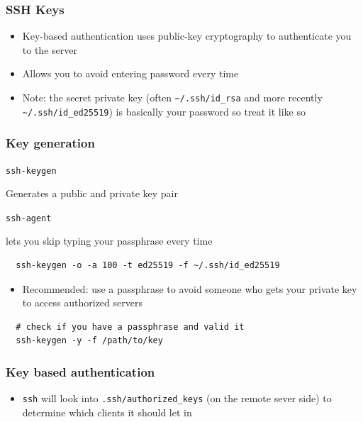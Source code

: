 \documentclass[letterpaper,12pt]{article}
\newcommand*{\lstitem}[1]{
  \setbox0\hbox{\lstinline{#1}}
  \item[\usebox0]
}
\begin{document}
\subsubsection{SSH Keys}

\begin{itemize}
  \item Key-based authentication uses public-key cryptography to authenticate you to the server
  \item Allows you to avoid entering password every time
  \item Note: the secret private key (often \lstinline{~/.ssh/id_rsa} and more recently \lstinline{~/.ssh/id_ed25519}) is basically your password so treat it like so
\end{itemize}

\subsubsection{Key generation}

\begin{description}
  \lstitem{ssh-keygen} Generates a public and private key pair
  \lstitem{ssh-agent} lets you skip typing your passphrase every time
\end{description}

\begin{lstlisting}
  ssh-keygen -o -a 100 -t ed25519 -f ~/.ssh/id_ed25519
\end{lstlisting}

\begin{itemize}
  \item Recommended: use a passphrase to avoid someone who gets your private key to access authorized servers
\end{itemize}

\begin{lstlisting}
  # check if you have a passphrase and valid it
  ssh-keygen -y -f /path/to/key
\end{lstlisting}

\subsubsection{Key based authentication}
\begin{itemize}
  \item \lstinline{ssh} will look into \lstinline{.ssh/authorized_keys} (on the remote sever side) to determine which clients it should let in
\end{itemize}
\end{document}
